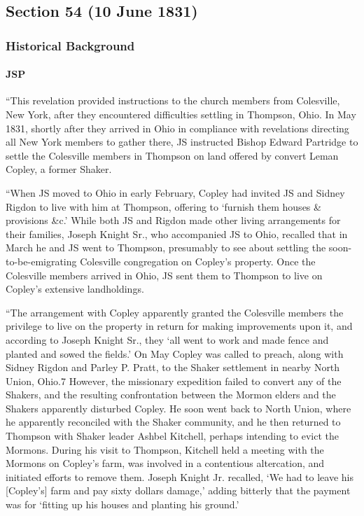 \subsection{Section 54 (10 June 1831)}
	\label{DC54}
	
	\subsubsection{Historical Background}
		\label{DC54-HB}
		
		\paragraph{JSP}
		
			``This revelation provided instructions to the church members from Colesville, New York, after they encountered difficulties settling in Thompson, Ohio. In May 1831, shortly after they arrived in Ohio in compliance with revelations directing all New York members to gather there, JS instructed Bishop Edward Partridge to settle the Colesville members in Thompson on land offered by convert Leman Copley, a former Shaker.
			
			``When JS moved to Ohio in early February, Copley had invited JS and Sidney Rigdon to live with him at Thompson, offering to `furnish them houses \& provisions \&c.' While both JS and Rigdon made other living arrangements for their families, Joseph Knight Sr., who accompanied JS to Ohio, recalled that in March he and JS went to Thompson, presumably to see about settling the soon-to-be-emigrating Colesville congregation on Copley's property. Once the Colesville members arrived in Ohio, JS sent them to Thompson to live on Copley's extensive landholdings.
			
			``The arrangement with Copley apparently granted the Colesville members the privilege to live on the property in return for making improvements upon it, and according to Joseph Knight Sr., they `all went to work and made fence and planted and sowed the fields.' On  May Copley was called to preach, along with Sidney Rigdon and Parley P. Pratt, to the Shaker settlement in nearby North Union, Ohio.7 However, the missionary expedition failed to convert any of the Shakers, and the resulting confrontation between the Mormon elders and the Shakers apparently disturbed Copley. He soon went back to North Union, where he apparently reconciled with the Shaker community, and he then returned to Thompson with Shaker leader Ashbel Kitchell, perhaps intending to evict the Mormons. During his visit to Thompson, Kitchell held a meeting with the Mormons on Copley's farm, was involved in a contentious altercation, and initiated efforts to remove them. Joseph Knight Jr. recalled, `We had to leave his [Copley's] farm and pay sixty dollars damage,' adding bitterly that the payment was for `fitting up his houses and planting his ground.'
			
